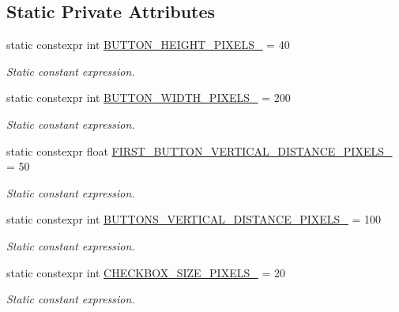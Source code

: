 \subsection*{Static Private Attributes}
\begin{DoxyCompactItemize}
\item 
static constexpr int \hyperlink{classGraphicalUserInterface_a16c6d010f7594c76c3d4b50f7cb4764b}{B\+U\+T\+T\+O\+N\+\_\+\+H\+E\+I\+G\+H\+T\+\_\+\+P\+I\+X\+E\+L\+S\+\_\+} = 40
\begin{DoxyCompactList}\small\item\em Static constant expression. \end{DoxyCompactList}\item 
static constexpr int \hyperlink{classGraphicalUserInterface_a90c125308f85a684fa6e609d474f4550}{B\+U\+T\+T\+O\+N\+\_\+\+W\+I\+D\+T\+H\+\_\+\+P\+I\+X\+E\+L\+S\+\_\+} = 200
\begin{DoxyCompactList}\small\item\em Static constant expression. \end{DoxyCompactList}\item 
static constexpr float \hyperlink{classGraphicalUserInterface_a6448ea8aab0807628a01487db52f76c2}{F\+I\+R\+S\+T\+\_\+\+B\+U\+T\+T\+O\+N\+\_\+\+V\+E\+R\+T\+I\+C\+A\+L\+\_\+\+D\+I\+S\+T\+A\+N\+C\+E\+\_\+\+P\+I\+X\+E\+L\+S\+\_\+} = 50
\begin{DoxyCompactList}\small\item\em Static constant expression. \end{DoxyCompactList}\item 
static constexpr int \hyperlink{classGraphicalUserInterface_aa5dd4f194d311d5b2dd3690ed0bad8ec}{B\+U\+T\+T\+O\+N\+S\+\_\+\+V\+E\+R\+T\+I\+C\+A\+L\+\_\+\+D\+I\+S\+T\+A\+N\+C\+E\+\_\+\+P\+I\+X\+E\+L\+S\+\_\+} = 100
\begin{DoxyCompactList}\small\item\em Static constant expression. \end{DoxyCompactList}\item 
static constexpr int \hyperlink{classGraphicalUserInterface_afe4127bf0dbfbba90ec15fea6e046379}{C\+H\+E\+C\+K\+B\+O\+X\+\_\+\+S\+I\+Z\+E\+\_\+\+P\+I\+X\+E\+L\+S\+\_\+} = 20
\begin{DoxyCompactList}\small\item\em Static constant expression. \end{DoxyCompactList}\end{DoxyCompactItemize}


